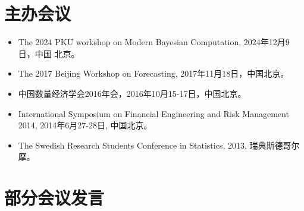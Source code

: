 \documentclass[twoside,a4paper,11pt]{article}
\begin{document}
\newpage
\section{主办会议}

\begin{itemize}

\item The 2024 PKU workshop on Modern Bayesian Computation, 2024年12月9日，中国   北京。

\item  The 2017 Beijing Workshop on Forecasting, 2017年11月18日，中国北京。
\item 中国数量经济学会2016年会，2016年10月15-17日，中国北京。

\item International Symposium on Financial Engineering and Risk Management 2014,
  2014年6月27-28日, 中国北京。

\item The Swedish Research Students Conference in Statistics, 2013, 瑞典斯德哥尔摩。
\end{itemize}

\section{部分会议发言}

\end{document}
